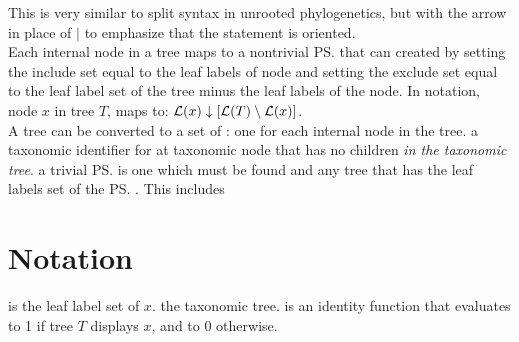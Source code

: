 \begin{compactenum}
    This is very similar to split syntax in unrooted phylogenetics, but with the arrow 
        in place of $\mid$ to emphasize that the statement is oriented.\\
    Each internal node in a tree maps to a nontrivial \ps that can created by setting
        the include set equal to the leaf labels of node and setting the exclude set equal
        to the leaf label set of the tree minus the leaf labels of the node.
        In notation, node $x$ in tree $T$, maps to: $\mathcal{L}(x)\downarrow{[\ensuremath{\mathcal{L}(T)} \setminus \ensuremath{\mathcal{L}(x)}]}$.\\
    A tree can be converted to a set of \pss: one for each internal node in the tree.
 a taxonomic identifier for at taxonomic node that
    has no children {\em in the taxonomic tree}.
 a trivial \ps is one which must be found and any tree that has
    the leaf labels set of the \ps.
    This includes

\end{compactenum}
\section{Notation}
\begin{compactenum}
     is the leaf label set of $x$.
    \notitem{\taxonomy} the taxonomic tree.
     is an identity function that evaluates to 1 if tree $T$
        displays $x$, and to 0 otherwise.
\end{compactenum}
